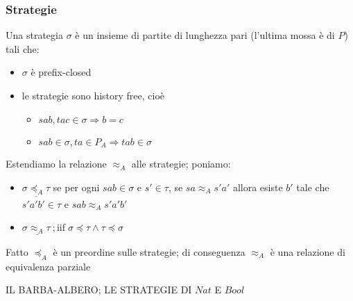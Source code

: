 \documentclass{beamer}
\begin{document}
\begin{frame}

	\frametitle{Strategie}
	
	Una strategia $\sigma$ è un insieme di partite di lunghezza pari (l'ultima mossa è di $P$) tali che:
	\begin{itemize}
		\item $\sigma$ è prefix-closed
		\item le strategie sono history free, cioè
		\begin{itemize}
			\item $sab , tac \in \sigma \Rightarrow b=c$
			\item $sab\in \sigma, ta\in P_A \Rightarrow tab\in \sigma$
		\end{itemize}

	\end{itemize}
	
	
	Estendiamo la relazione $\approx_A$ alle strategie; poniamo:
	\begin{itemize}
		\item $\underline{ \sigma \preccurlyeq_A \tau }$ se per ogni $sab \in \sigma$ e $s' \in \tau$, se $sa\approx_A s'a'$ allora esiste $b'$ tale che $s'a'b' \in \tau$ e $sab\approx_A s'a'b'$
	\item $\underline{ \sigma \approx_A \tau \ }; \text{iif} \; \sigma \preccurlyeq \tau \wedge \tau \preccurlyeq \sigma$
	\end{itemize}
	
	\begin{block}{Fatto}
		$\preccurlyeq_A$ è un preordine sulle strategie; di conseguenza $\approx_A$ è una relazione di equivalenza parziale
	\end{block}
	
\end{frame}

\begin{frame}
	
	

	IL BARBA-ALBERO; LE STRATEGIE DI $Nat$ E $Bool$\\

\end{frame}
\end{document}

